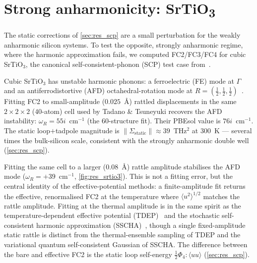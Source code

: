 \section{Strong anharmonicity: SrTiO\textsubscript{3}}
\label{sec:res_strong}

The static corrections of \cref{sec:res_scp} are a small perturbation for the
weakly anharmonic silicon systems. To test the opposite, strongly anharmonic
regime, where the harmonic approximation fails, we computed
FC2/FC3/FC4 for cubic SrTiO$_3$, the canonical
self-consistent-phonon (SCP) test case from~\cite{tadano_first-principles_2018}.

Cubic SrTiO$_3$ has unstable harmonic phonons: a ferroelectric (FE) mode at $\Gamma$ and an
antiferrodistortive (AFD) octahedral-rotation mode at
$R=(\tfrac12,\tfrac12,\tfrac12)$~\cite{tadano_first-principles_2018}. Fitting FC2 to
small-amplitude ($0.025$~\AA) rattled displacements in the same $2\times2\times2$
($40$-atom) cell used by Tadano \& Tsuneyuki recovers the AFD instability:
$\omega_R = 55i$~cm$^{-1}$ (the $60$-structure fit).
Their PBEsol value is $76i$~cm$^{-1}$. The static loop$+$tadpole magnitude is
$\|\Sigma_\mathrm{static}\|\approx39$~THz$^2$ at $300$~K --- several times
the bulk-silicon scale, consistent with the strongly anharmonic double well
(\cref{sec:res_scp}).

Fitting the same cell to a larger ($0.08$~\AA) rattle amplitude stabilises the AFD mode
($\omega_R = +39$~cm$^{-1}$, \cref{fig:res_srtio3}). This is not a fitting error,
but the central identity of the effective-potential methods: a finite-amplitude fit
returns the effective, renormalised FC2 at the temperature where
$\langle u^2\rangle^{1/2}$ matches the rattle amplitude. Fitting at the thermal
amplitude is in the same spirit as the temperature-dependent effective potential
(TDEP)~\cite{hellman_temperature_2013} and the stochastic self-consistent harmonic
approximation (SSCHA)~\cite{monacelli_stochastic_2021}, though a single
fixed-amplitude static rattle is distinct from the thermal-ensemble sampling of
TDEP and the variational quantum self-consistent Gaussian of SSCHA. The difference between
the bare and effective FC2 is the static loop self-energy
$\tfrac12\Phi_4\!:\!\langle uu\rangle$ (\cref{sec:res_scp}).

